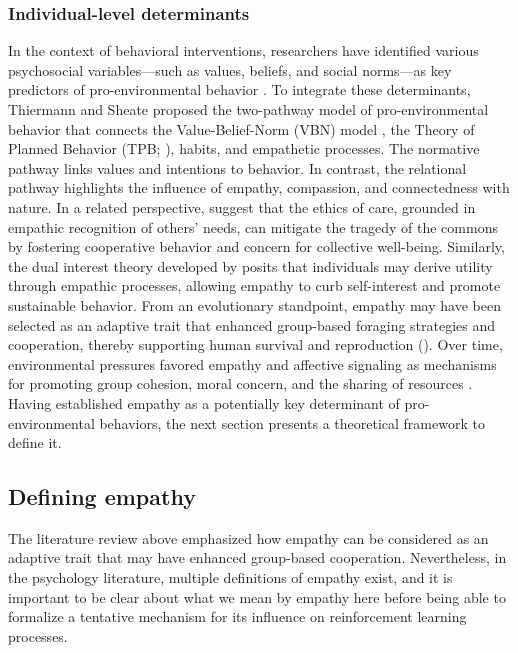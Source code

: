 \subsubsection{Individual-level determinants}
In the context of behavioral interventions, researchers have identified various psychosocial variables—such as values, beliefs, and social norms—as key predictors of pro-environmental behavior \cite{fornaraExtendedValueBeliefNormTheory2020,guoResidentialElectricityConsumption2018,liWhatInfluencesIndividuals2019,sussmanProEnvironmentalValuesMatter2016}. To integrate these determinants, Thiermann and Sheate \cite{thiermannMotivatingIndividualsSocial2020} proposed the two-pathway model of pro-environmental behavior that connects the Value-Belief-Norm (VBN) model \cite{sternValuebeliefnormTheorySupport1999}, the Theory of Planned Behavior (TPB; \cite{ajzenTheoryPlannedBehavior1991}), habits, and empathetic processes. The normative pathway links values and intentions to behavior. In contrast, the relational pathway highlights the influence of empathy, compassion, and connectedness with nature.
In a related perspective, \cite{moreno-casasEthicsCareTragedy2021} suggest that the ethics of care, grounded in empathic recognition of others' needs, can mitigate the tragedy of the commons by fostering cooperative behavior and concern for collective well-being. Similarly, the dual interest theory developed by \cite{lynneTheoreticalFoundationEmpathy2016} posits that individuals may derive utility through empathic processes, allowing empathy to curb self-interest and promote sustainable behavior.
From an evolutionary standpoint, empathy may have been selected as an adaptive trait that enhanced group-based foraging strategies and cooperation, thereby supporting human survival and reproduction (\cite{tomaselloTwoKeySteps2012}). Over time, environmental pressures favored empathy and affective signaling as mechanisms for promoting group cohesion, moral concern, and the sharing of resources \cite{cuffEmpathyReviewConcept2016,decetyEmergenceEmpathyDevelopmental2021,tomaselloOriginsHumanCooperation2013}. Having established empathy as a potentially key determinant of pro-environmental behaviors, the next section presents a theoretical framework to define it.



\subsection{Defining empathy}
The literature review above emphasized how empathy can be considered as an adaptive trait that may have enhanced group-based cooperation. Nevertheless, in the psychology literature, multiple definitions of empathy exist, and it is important to be clear about what we mean by empathy here before being able to formalize a tentative mechanism for its influence on reinforcement learning processes.

